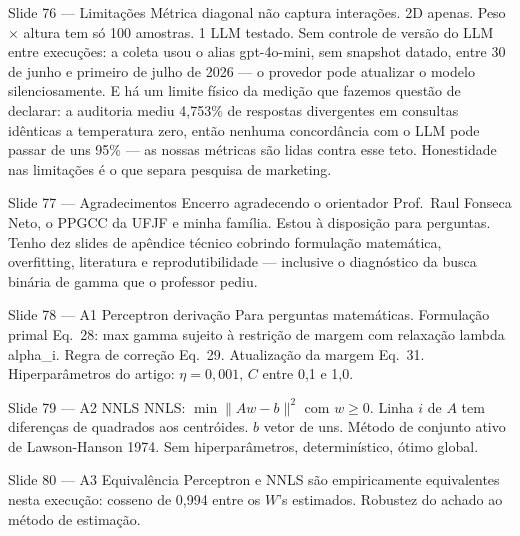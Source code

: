 \documentclass[aspectratio=169,10pt]{beamer}
\begin{document}
\begin{frame}{Slide 76 --- Limita\c{c}\~oes}
\footnotesize
M\'etrica diagonal n\~ao captura intera\c{c}\~oes. 2D apenas. Peso $\times$ altura tem s\'o 100 amostras. 1 LLM testado. Sem controle de vers\~ao do LLM entre execu\c{c}\~oes: a coleta usou o alias gpt-4o-mini, sem snapshot datado, entre 30 de junho e primeiro de julho de 2026 --- o provedor pode atualizar o modelo silenciosamente. E h\'a um limite f\'isico da medi\c{c}\~ao que fazemos quest\~ao de declarar: a auditoria mediu 4,753\% de respostas divergentes em consultas id\^enticas a temperatura zero, ent\~ao nenhuma concord\^ancia com o LLM pode passar de uns 95\% --- as nossas m\'etricas s\~ao lidas contra esse teto. Honestidade nas limita\c{c}\~oes \'e o que separa pesquisa de marketing.
\end{frame}

\begin{frame}{Slide 77 --- Agradecimentos}
\footnotesize
Encerro agradecendo o orientador Prof.\ Raul Fonseca Neto, o PPGCC da UFJF e minha fam\'ilia. Estou \`a disposi\c{c}\~ao para perguntas. Tenho dez slides de ap\^endice t\'ecnico cobrindo formula\c{c}\~ao matem\'atica, overfitting, literatura e reprodutibilidade --- inclusive o diagn\'ostico da busca bin\'aria de gamma que o professor pediu.
\end{frame}

\begin{frame}{Slide 78 --- A1 Perceptron deriva\c{c}\~ao}
\footnotesize
Para perguntas matem\'aticas. Formula\c{c}\~ao primal Eq.\ 28: max gamma sujeito \`a restri\c{c}\~ao de margem com relaxa\c{c}\~ao lambda alpha\_i. Regra de corre\c{c}\~ao Eq.\ 29. Atualiza\c{c}\~ao da margem Eq.\ 31. Hiperpar\^ametros do artigo: $\eta = 0{,}001$, $C$ entre 0{,}1 e 1{,}0.
\end{frame}

\begin{frame}{Slide 79 --- A2 NNLS}
\footnotesize
NNLS: $\min \|Aw - b\|^2$ com $w \geq 0$. Linha $i$ de $A$ tem diferen\c{c}as de quadrados aos centr\'oides. $b$ vetor de uns. M\'etodo de conjunto ativo de Lawson-Hanson 1974. Sem hiperpar\^ametros, determin\'istico, \'otimo global.
\end{frame}

\begin{frame}{Slide 80 --- A3 Equival\^encia}
\footnotesize
Perceptron e NNLS s\~ao empiricamente equivalentes nesta execu\c{c}\~ao: cosseno de 0{,}994 entre os $W$'s estimados. Robustez do achado ao m\'etodo de estima\c{c}\~ao.
\end{frame}
\end{document}
